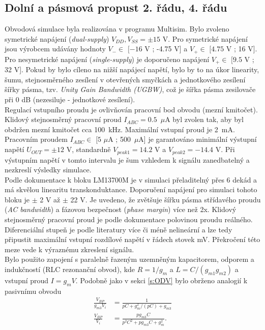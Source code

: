 \subsection{Dolní a pásmová propust 2. řádu, 4. řádu}\label{s:DP2}
\noindent Obvodová simulace byla realizována v programu Multisim. Bylo zvoleno symetrické napájení (\textit{dual-supply}) $V_{DD},V_{SS} = \pm 15$ V. Pro symetrické napájení jsou výrobcem udávány hodnoty $V_{-} \in$ $[-16$ V ; -4.75 V] a $V_{+} \in$ $[4.75$ V ; 16 V]. Pro nesymetrické napájení (\textit{single-supply}) je doporučeno napájení $V_{+} \in$ $[9.5$ V ; 32 V]. Pokud by bylo cíleno na nižší napájecí napětí, bylo by to na úkor linearity, šumu, stejnosměrného zesílení v otevřených smyčkách a jednotkového zesílení šířky pásma, tzv. \textit{Unity Gain Bandwidth (UGBW)}, což je šířka pásma zesilovače při 0 dB (nezesiluje - jednotkové zesílení).\\
Regulací vstupního proudu je ovlivňován pracovní bod obvodu (mezní kmitočet). Klidový stejnosměrný pracovní proud $I_{ABC} = 0.5$~$\mu$A byl zvolen tak, aby byl obdržen mezní kmitočet cca 100~kHz. Maximální vstupní proud je 2~mA. Pracovním proudem $I_{ABC} \in$ $[5$ $\mu$A ; 500~$\mu$A] je garantováno minimální výstupní napětí $U_{OUT} = \pm 12$ V, standardně $V_{peak 1} = 14.2$ V a $V_{peak 2} = -14.4$ V. Při výstupním napětí v tomto intervalu je šum vzhledem k signálu zanedbatelný a nezkreslí výsledky simulace.\\
\noindent Podle dokumentace k bloku LM13700M je v simulaci přeladitelný přes 6 dekád a má skvělou linearitu transkonduktance. Doporučení napájení pro simulaci tohoto bloku je $\pm$ 2 V až $\pm$ 22 V. Je uvedeno, že zvětšuje šířku pásma střídavého proudu (\textit{AC bandwidth}) a fázovou bezpečnost (\textit{phase margin}) více než 2x. Klidový stejnosměrný pracovní proud je podle dokumentace polovinou proudu reálného.\\
\noindent Diferenciální stupeň je podle literatury \cite{8} více či méně nelineární a lze tedy připustit maximální vstupní rozdílové napětí v řádech stovek mV. Překročení této meze vede k výraznému zkreslení signálu.\\
\noindent Bylo použito zapojení s paralelně řazeným uzemněným kapacitorem, odporem a indukčností (RLC rezonanční obvod), kde $R = 1/g_m$ a $L = C/(g_{m1}g_{m2})$ a vstupní proud $I = g_mV$. Podobně jako v sekci \ref{s:ODV} bylo obrženo analogií k pasivnímu obvodu
\begin{align}
\frac{V_{BP}}{g_{m3}V_i} &= \frac{1}{pC + g_m^2/(pC) + g_{m3}}\\
\frac{V_{BP}}{V_i} &= \frac{pg_{m3}C}{p^2C^2 + pg_{m3}C + g_m^2}.
\end{align}
